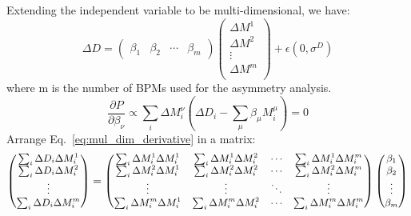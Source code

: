 Extending the independent variable to be multi-dimensional, we have:
\begin{equation}
    \Delta D = \begin{pmatrix} \beta_1 & \beta_2 & \cdots & \beta_m \end{pmatrix} 
	\begin{pmatrix}
	    \Delta M^1	\\
	    \Delta M^2	\\
	    \vdots 	\\
	    \Delta M^m	\\
	\end{pmatrix}
	+ \epsilon(0, \sigma^D)
\end{equation}
where m is the number of BPMs used for the asymmetry analysis.
\begin{equation}
    \frac{\partial P}{\partial \beta_\nu} \propto \sum_i \Delta M_i^\nu (\Delta D_i - \sum_\mu \beta_\mu M_i^\mu) = 0
    \label{eq:mul_dim_derivative}
\end{equation}
Arrange Eq.~\ref{eq:mul_dim_derivative} in a matrix:
\begin{equation}
    \small
    \begin{pmatrix}
	\sum_i \Delta D_i \Delta M_i^1 \\
	\sum_i \Delta D_i \Delta M_i^2 \\
	\vdots	\\
	\sum_i \Delta D_i \Delta M_i^m \\
    \end{pmatrix}
    = 
    \begin{pmatrix}
	\sum_i \Delta M_i^1 \Delta M_i^1    & \sum_i \Delta M_i^1 \Delta M_i^2	&
	\cdots	& \sum_i \Delta M_i^1 \Delta M_i^m  \\
	\sum_i \Delta M_i^2 \Delta M_i^1    & \sum_i \Delta M_i^2 \Delta M_i^2	&
	\cdots	& \sum_i \Delta M_i^2 \Delta M_i^m  \\
	\vdots	& \vdots    & \ddots	& \vdots    \\
	\sum_i \Delta M_i^m \Delta M_i^1    & \sum_i \Delta M_i^m \Delta M_i^2	&
	\cdots	& \sum_i \Delta M_i^m \Delta M_i^m  \\
    \end{pmatrix}
    \begin{pmatrix}
	\beta_1 \\
	\beta_2 \\
	\vdots	\\
	\beta_m \\ 
    \end{pmatrix}
\end{equation}

